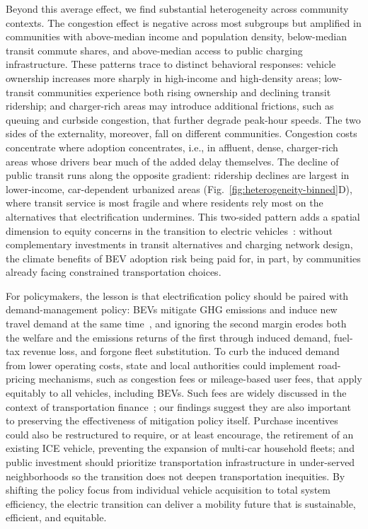 \documentclass[11pt, letterpaper]{article}
\begin{document}
Beyond this average effect, we find substantial heterogeneity across community contexts.
The congestion effect is negative across most subgroups but amplified in communities with above-median income and population density, below-median transit commute shares, and above-median access to public charging infrastructure.
These patterns trace to distinct behavioral responses: vehicle ownership increases more sharply in high-income and high-density areas; low-transit communities experience both rising ownership and declining transit ridership; and charger-rich areas may introduce additional frictions, such as queuing and curbside congestion, that further degrade peak-hour speeds.
The two sides of the externality, moreover, fall on different communities.
Congestion costs concentrate where adoption concentrates, i.e., in affluent, dense, charger-rich areas whose drivers bear much of the added delay themselves.
The decline of public transit runs along the opposite gradient: ridership declines are largest in lower-income, car-dependent urbanized areas (Fig.~\ref{fig:heterogeneity-binned}D), where transit service is most fragile and where residents rely most on the alternatives that electrification undermines.
This two-sided pattern adds a spatial dimension to equity concerns in the transition to electric vehicles~\citep{Carlton2023, Hardman2021}: without complementary investments in transit alternatives and charging network design, the climate benefits of BEV adoption risk being paid for, in part, by communities already facing constrained transportation choices.

For policymakers, the lesson is that electrification policy should be paired with demand-management policy: BEVs mitigate GHG emissions and induce new travel demand at the same time~\citep{Jenn2018, Langbroek2016}, and ignoring the second margin erodes both the welfare and the emissions returns of the first through induced demand, fuel-tax revenue loss, and forgone fleet substitution.
To curb the induced demand from lower operating costs, state and local authorities could implement road-pricing mechanisms, such as congestion fees or mileage-based user fees, that apply equitably to all vehicles, including BEVs.
Such fees are widely discussed in the context of transportation finance~\citep{Noll2026, Levis2025}; our findings suggest they are also important to preserving the effectiveness of mitigation policy itself.
Purchase incentives could also be restructured to require, or at least encourage, the retirement of an existing ICE vehicle, preventing the expansion of multi-car household fleets; and public investment should prioritize transportation infrastructure in under-served neighborhoods so the transition does not deepen transportation inequities.
By shifting the policy focus from individual vehicle acquisition to total system efficiency, the electric transition can deliver a mobility future that is sustainable, efficient, and equitable.
\end{document}
